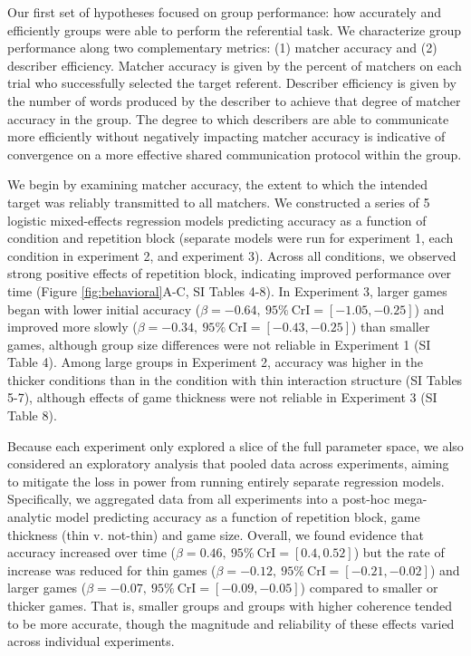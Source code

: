 \documentclass[
  english,
]{article}
\begin{document}
Our first set of hypotheses focused on group performance: how accurately and efficiently groups were able to perform the referential task.
We characterize group performance along two complementary metrics: (1) matcher accuracy and (2) describer efficiency.
Matcher accuracy is given by the percent of matchers on each trial who successfully selected the target referent.
Describer efficiency is given by the number of words produced by the describer to achieve that degree of matcher accuracy in the group.
The degree to which describers are able to communicate more efficiently without negatively impacting matcher accuracy is indicative of convergence on a more effective shared communication protocol within the group.

We begin by examining matcher accuracy, the extent to which the intended target was reliably transmitted to all matchers.
We constructed a series of 5 logistic mixed-effects regression models predicting accuracy as a function of condition and repetition block (separate models were run for experiment 1, each condition in experiment 2, and experiment 3).
Across all conditions, we observed strong positive effects of repetition block, indicating improved performance over time (Figure \ref{fig:behavioral}A-C, SI Tables 4-8).
In Experiment 3, larger games began with lower initial accuracy (\(\beta=-0.64,\:95\%\:\mathrm{CrI}=[-1.05, -0.25]\)) and improved more slowly (\(\beta=-0.34,\:95\%\:\mathrm{CrI}=[-0.43, -0.25]\)) than smaller games, although group size differences were not reliable in Experiment 1 (SI Table 4).
Among large groups in Experiment 2, accuracy was higher in the thicker conditions than in the condition with thin interaction structure (SI Tables 5-7), although effects of game thickness were not reliable in Experiment 3 (SI Table 8).

Because each experiment only explored a slice of the full parameter space, we also considered an exploratory analysis that pooled data across experiments, aiming to mitigate the loss in power from running entirely separate regression models.
Specifically, we aggregated data from all experiments into a post-hoc mega-analytic model predicting accuracy as a function of repetition block, game thickness (thin v. not-thin) and game size.
Overall, we found evidence that accuracy increased over time (\(\beta=0.46,\:95\%\:\mathrm{CrI}=[0.4, 0.52]\)) but the rate of increase was reduced for thin games (\(\beta=-0.12,\:95\%\:\mathrm{CrI}=[-0.21, -0.02]\)) and larger games (\(\beta=-0.07,\:95\%\:\mathrm{CrI}=[-0.09, -0.05]\)) compared to smaller or thicker games.
That is, smaller groups and groups with higher coherence tended to be more accurate, though the magnitude and reliability of these effects varied across individual experiments.
\end{document}
